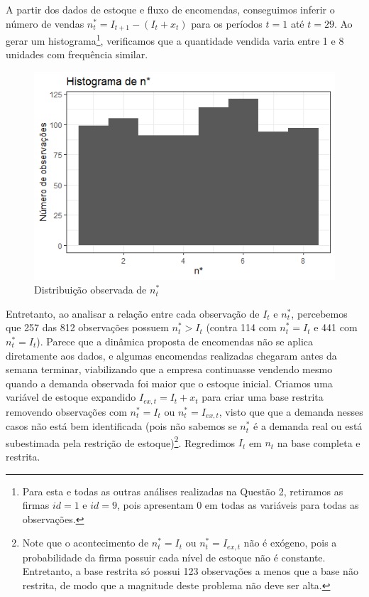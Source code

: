 \documentclass{article}
\begin{document}
A partir dos dados de estoque e fluxo de encomendas, conseguimos inferir o número de vendas $n^*_t = I_{t+1} - (I_t + x_t)$ para os períodos $t = 1$ até $t = 29$. Ao gerar um histograma\footnote{Para esta e todas as  outras análises realizadas na Questão 2, retiramos as firmas $id = 1$ e $id = 9$, pois apresentam 0 em todas as variáveis para todas as observações.}, verificamos que a quantidade vendida varia entre 1 e 8 unidades com frequência similar.

\begin{figure}[H]
    \centering
    \includegraphics[width=0.5\linewidth]{figs and tabs/hist_nstar.png}
    \caption{Distribuição observada de $n^*_t$}
    \label{fig:histn}
\end{figure}

Entretanto, ao analisar a relação entre cada observação de $I_t$ e $n^*_t$, percebemos que 257 das 812 observações possuem $n^*_t > I_t$ (contra 114 com $n^*_t = I_t$ e 441 com $n^*_t = I_t$). Parece que a dinâmica proposta de encomendas não se aplica diretamente aos dados, e algumas encomendas realizadas chegaram antes da semana terminar, viabilizando que a empresa continuasse vendendo mesmo quando a demanda observada foi maior que o estoque inicial. Criamos uma variável de estoque expandido $I_{ex, t} = I_t + x_t$ para criar uma base restrita removendo observações com $n^*_t = I_t$ ou $n^*_t = I_{ex, t}$, visto que que a demanda nesses casos não está bem identificada (pois não sabemos se $n^*_t$ é a demanda real ou está subestimada pela restrição de estoque)\footnote{Note que o acontecimento de $n^*_t = I_t$ ou $n^*_t = I_{ex, t}$ não é exógeno, pois a probabilidade da firma possuir cada nível de estoque não é constante. Entretanto, a base restrita só possui 123 observações a menos que a base não restrita, de modo que a magnitude deste problema não deve ser alta.}. Regredimos $I_t$ em $n_t$ na base completa e restrita.
\end{document}
